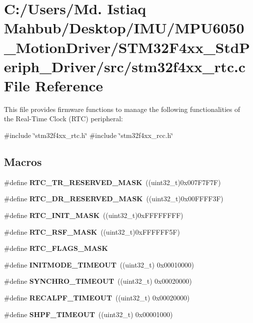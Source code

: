 \section{C\+:/\+Users/\+Md. Istiaq Mahbub/\+Desktop/\+I\+M\+U/\+M\+P\+U6050\+\_\+\+Motion\+Driver/\+S\+T\+M32\+F4xx\+\_\+\+Std\+Periph\+\_\+\+Driver/src/stm32f4xx\+\_\+rtc.c File Reference}
\label{stm32f4xx__rtc_8c}


This file provides firmware functions to manage the following functionalities of the Real-\/\+Time Clock (R\+TC) peripheral\+:  


{\ttfamily \#include \char`\"{}stm32f4xx\+\_\+rtc.\+h\char`\"{}}\newline
{\ttfamily \#include \char`\"{}stm32f4xx\+\_\+rcc.\+h\char`\"{}}\newline
\subsection*{Macros}
\begin{DoxyCompactItemize}
\item 
\#define \textbf{ R\+T\+C\+\_\+\+T\+R\+\_\+\+R\+E\+S\+E\+R\+V\+E\+D\+\_\+\+M\+A\+SK}~((uint32\+\_\+t)0x007\+F7\+F7\+F)
\item 
\#define \textbf{ R\+T\+C\+\_\+\+D\+R\+\_\+\+R\+E\+S\+E\+R\+V\+E\+D\+\_\+\+M\+A\+SK}~((uint32\+\_\+t)0x00\+F\+F\+F\+F3\+F)
\item 
\#define \textbf{ R\+T\+C\+\_\+\+I\+N\+I\+T\+\_\+\+M\+A\+SK}~((uint32\+\_\+t)0x\+F\+F\+F\+F\+F\+F\+F\+F)
\item 
\#define \textbf{ R\+T\+C\+\_\+\+R\+S\+F\+\_\+\+M\+A\+SK}~((uint32\+\_\+t)0x\+F\+F\+F\+F\+F\+F5\+F)
\item 
\#define \textbf{ R\+T\+C\+\_\+\+F\+L\+A\+G\+S\+\_\+\+M\+A\+SK}
\item 
\#define \textbf{ I\+N\+I\+T\+M\+O\+D\+E\+\_\+\+T\+I\+M\+E\+O\+UT}~((uint32\+\_\+t) 0x00010000)
\item 
\#define \textbf{ S\+Y\+N\+C\+H\+R\+O\+\_\+\+T\+I\+M\+E\+O\+UT}~((uint32\+\_\+t) 0x00020000)
\item 
\#define \textbf{ R\+E\+C\+A\+L\+P\+F\+\_\+\+T\+I\+M\+E\+O\+UT}~((uint32\+\_\+t) 0x00020000)
\item 
\#define \textbf{ S\+H\+P\+F\+\_\+\+T\+I\+M\+E\+O\+UT}~((uint32\+\_\+t) 0x00001000)
\end{DoxyCompactItemize}
